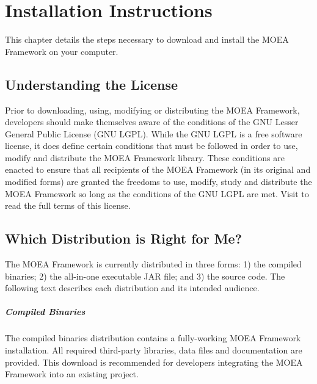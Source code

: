%
%

\chapter{Installation Instructions}

This chapter details the steps necessary to download and install the MOEA Framework on your computer.

\section{Understanding the License}

Prior to downloading, using, modifying or distributing the MOEA Framework, developers should make themselves aware of the conditions of the GNU Lesser General Public License (GNU LGPL).  While the GNU LGPL is a free software license, it does define certain conditions that must be followed in order to use, modify and distribute the MOEA Framework library.  These conditions are enacted to ensure that all recipients of the MOEA Framework (in its original and modified forms) are granted the freedoms to use, modify, study and distribute the MOEA Framework so long as the conditions of the GNU LGPL are met.  Visit  to read the full terms of this license.

\section{Which Distribution is Right for Me?}

The MOEA Framework is currently distributed in three forms: 1) the compiled binaries; 2) the all-in-one executable JAR file; and 3) the source code.  The following text describes each distribution and its intended audience.

\paragraph{Compiled Binaries}
The compiled binaries distribution contains a fully-working MOEA Framework installation.  All required third-party libraries, data files and documentation are provided.  This download is recommended for developers integrating the MOEA Framework into an existing project.

